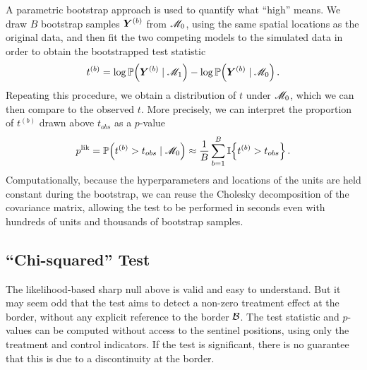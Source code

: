 	A parametric bootstrap approach is used to quantify what ``high'' means. We draw \(B\) bootstrap samples \(\bm{Y}^{(b)}\) from \(\mathscr{M}_0\),
using the same spatial locations as the original data,
and then fit the two competing models to the simulated data in order to obtain the bootstrapped test statistic
\begin{equation}
    t^{(b)} = \log \Pr\del{\Yvec^{(b)} \mid \modalt} - \log \Pr\del{\Yvec^{(b)} \mid \modnull}\,.
\end{equation}
Repeating this procedure, we obtain a distribution of \(t\) under \(\mathscr{M}_0\),
which we can then compare to the observed \(t\).
More precisely, we can interpret the proportion of \(t^{(b)}\) drawn above \(t_{obs}\) as a \(p\)-value
\begin{equation}
    p^{\mathrm{lik}} = \Pr\del{t^{(b)} > t_{obs} \mid \modnull}
                     \approx \frac{1}{B} \sum_{b=1}^B \Ind\cbr{t^{(b)} > t_{obs}}
                     \,.
\end{equation}
Computationally, because the hyperparameters and locations of the units are held constant during the bootstrap, we can reuse the Cholesky decomposition of the covariance matrix, allowing the test to be performed in seconds even with hundreds of units and thousands of bootstrap samples.

\subsection{``Chi-squared'' Test}
The likelihood-based sharp null above is valid and easy to understand.
But it may seem odd that the test aims to detect a non-zero treatment effect at the border, without any explicit reference to the border \(\mathcal{B}\).
The test statistic and \(p\)-values can be computed without access to the sentinel positions, using only the treatment and control indicators.
If the test is significant, there is no guarantee that this is due to a discontinuity at the border.

